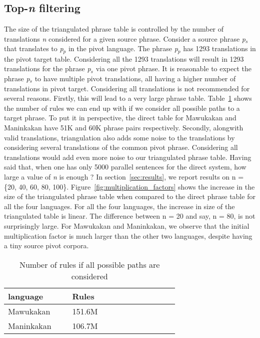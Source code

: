 \subsection{Top-\emph{n} filtering}
\label{subsec:topn}
 The size of the triangulated phrase table is controlled by the number of translations \emph{n} considered for a given source phrase. Consider a source phrase \emph{p$_s$} that translates to \emph{p$_p$} in the pivot language. The phrase \emph{p$_p$} has 1293 translations in the pivot target table. Considering all the 1293 translations will result in 1293 translations for the phrase \emph{p$_s$} via one pivot phrase. It is reasonable to expect the phrase \emph{p$_s$} to have multiple pivot translations, all having a higher number of translations in pivot target. Considering all translations is not recommended for several reasons. Firstly, this will lead to a very large phrase table. Table~\ref{table:allrules} shows the number of rules we can end up with if we consider all possible paths to a target phrase. To put it in perspective, the direct table for Mawukakan and Maninkakan have 51K and 60K phrase pairs respectively. Secondly, alongwith valid translations, triangulation also adds some noise to the translations by considering several translations of the common pivot phrase. Considering all translations would add even more noise to our triangulated phrase table. Having said that, when one has only 5000 parallel sentences for the direct system, how large a value of \emph{n} is enough ? In section~\ref{sec:results}, we report results on n = \{20, 40, 60, 80, 100\}. Figure~\ref{fig:multiplication_factors} shows the increase in the size of the triangulated phrase table when compared to the direct phrase table for all the four languages. For all the four languages, the increase in size of the triangulated table is linear. The difference between n = 20 and say, n = 80, is not surprisingly large. For Mawukakan and Maninkakan, we observe that the initial multiplication factor is much larger than the other two languages, despite having a tiny source pivot corpora.

        \begin{table}
                \footnotesize
                \small
                \centering

                \begin{tabular}{p{0.3\linewidth}p{0.5\linewidth}}
                \toprule
                language &  Rules \\
                \toprule
                Mawukakan & 151.6M \\
                Maninkakan & 106.7M \\
                \bottomrule
                \end{tabular}
                \caption{Number of rules if all possible paths are considered}
                \label{table:allrules}
        \end{table}


